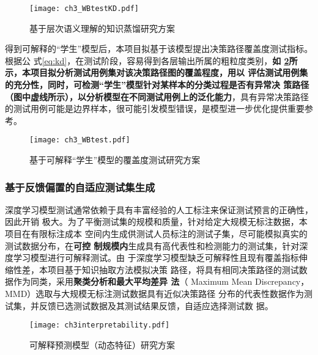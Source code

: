 \begin{figure}[htp]
    \begin{small}
        \begin{center}
            \texttt{[image: ch3\_WBtestKD.pdf]}
        \end{center}
        \caption{基于层次语义理解的知识蒸馏研究方案}
        \label{fig:ch3:WBtestKD}
    \end{small}
\end{figure}

得到可解释的``学生''模型后，本项目拟基于该模型提出决策路径覆盖度测试指标。根据公
式\eqref{eq:kd}，在测试阶段，容易得到各层输出所属的粗粒度类别，\textbf{如
\cref{fig:ch3:WBtest}所示，本项目拟分析测试用例集对该决策路径图的覆盖程度，用以
评估测试用例集的充分性，同时，可检测``学生''模型针对某样本的分类过程是否有异常决
策路径（图中虚线所示），以分析模型在不同测试用例上的泛化能力}，具有异常决策路径
的测试用例可能是边界样本，很可能引发模型错误，是模型进一步优化提供重要参考。
\begin{figure}[htp]
    \begin{small}
        \begin{center}
            \texttt{[image: ch3\_WBtest.pdf]}
        \end{center}
        \caption{基于可解释``学生''模型的覆盖度测试研究方案}
        \label{fig:ch3:WBtest}
    \end{small}
\end{figure}

\subsubsection{基于反馈偏置的自适应测试集生成}\label{ch3_3}

深度学习模型测试通常依赖于具有丰富经验的人工标注来保证测试预言的正确性，因此开销
极大。为了平衡测试集的规模和质量，针对给定大规模无标注数据，本项目在有限标注成本
空间内生成供测试人员标注的测试子集，尽可能模拟真实的测试数据分布，在\textbf{可控
制规模内}生成具有高代表性和检测能力的测试集，针对深度学习模型进行可解释测试。由
于深度学习模型缺乏可解释性且现有覆盖指标伸缩性差，本项目基于知识抽取方法模拟决策
路径，将具有相同决策路径的测试数据作为同类，采用\textbf{聚类分析和最大平均差异
法}（ Maximum Mean Discrepancy，MMD）选取与大规模无标注测试数据具有近似决策路径
分布的代表性数据作为测试集，并反馈已选测试数据及其测试结果反馈，自适应选择测试数
据。


\begin{figure}[htp]
    \begin{small}
        \begin{center}
            \texttt{[image: ch3interpretability.pdf]}
        \end{center}
        \caption{可解释预测模型（动态特征）研究方案}
        \label{fig:ch3:interpretability}
    \end{small}
\end{figure}

